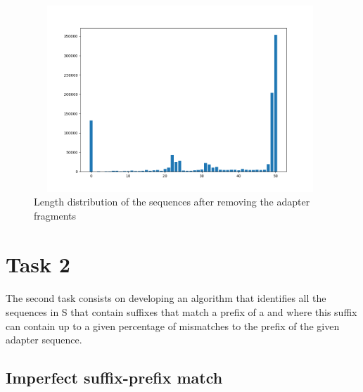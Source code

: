 \documentclass[a4paper,10pt]{article}
\begin{document}
\begin{figure}[H]
    \centering
    \includegraphics[width=11cm, height=7cm]{images/length-distr.png}
    \caption{Length distribution of the sequences after removing the adapter fragments}
    \label{length-distr}
\end{figure}

\newpage

\section{Task 2} \label{task2}

\paragraph{} The second task consists on developing an algorithm that identifies all the sequences in S that contain suffixes that match a prefix of a and where this suffix can contain up to a given percentage of mismatches to the prefix of the given adapter sequence.

\subsection{Imperfect suffix-prefix match} \label{imperfect}
\end{document}
